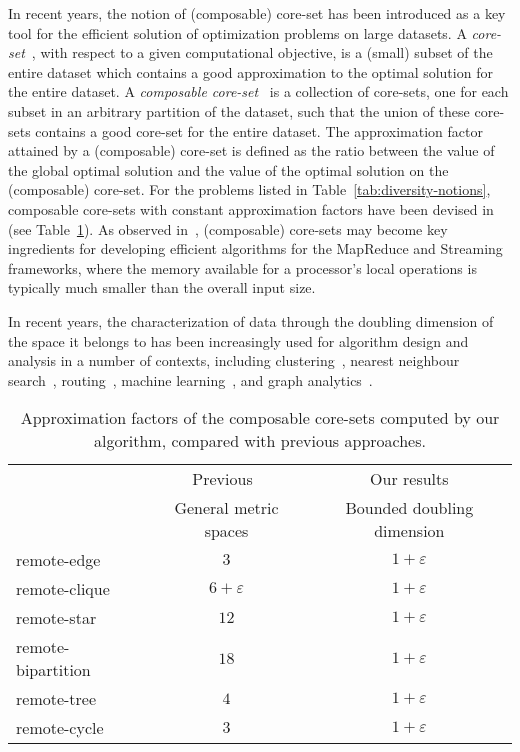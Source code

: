 \documentclass{article}
\renewcommand{\epsilon}{\varepsilon}
\begin{document}
In recent years, the notion of (composable) core-set has been
introduced as a key tool for the efficient solution of optimization
problems on large datasets.  A \emph{core-set}~\cite{AgarwalHV05},
with respect to a given computational objective, is a (small) subset
of the entire dataset which contains a good approximation to the
optimal solution for the entire dataset. A \emph{composable
  core-set}~\cite{IndykMMM14} is a collection of core-sets, one for
each subset in an arbitrary partition of the dataset, such that the
union of these core-sets contains a good core-set for the entire
dataset. The approximation factor attained by a (composable) core-set
is defined as the ratio between the value of the global optimal
solution and the value of the optimal solution on the (composable)
core-set. For the problems listed in
Table~\ref{tab:diversity-notions}, composable core-sets with constant
approximation factors have been devised in
\cite{IndykMMM14,AghamolaeiFZ15} (see
Table~\ref{tab:core-set-approximations}).  As observed
in~\cite{IndykMMM14}, (composable) core-sets may become key
ingredients for developing efficient algorithms for the MapReduce and
Streaming frameworks, where the memory available for a processor's
local operations is typically much smaller than the overall input
size.

In recent years, the characterization of data through the doubling
dimension of the space it belongs to has been increasingly used for
algorithm design and analysis in a number of contexts, including
clustering~\cite{AckermannBS10}, nearest neighbour
search~\cite{ColeL06}, routing~\cite{KonjevodRX08}, machine
learning~\cite{GottliebKK14}, and graph
analytics~\cite{CeccarelloPPU15, CeccarelloPPU16}.


\begin{table}
  \centering
  \begin{tabular}{lcc}\toprule
     & Previous~\cite{IndykMMM14,AghamolaeiFZ15}
     & Our results
    \\
     & {\footnotesize General metric spaces}
     & {\footnotesize Bounded doubling dimension}
    \\
    \midrule
    remote-edge
     & $3$
     & $1+\epsilon$
    \\
    remote-clique
& $6+\epsilon$ 
     & $1+\epsilon$
    \\
    remote-star
     & $12$ 
     & $1+\epsilon$
    \\
    remote-bipartition
     & $18$
     & $1+\epsilon$
    \\
    remote-tree
     & $4$ 
     & $1+\epsilon$
    \\
    remote-cycle
     & $3$ 
     & $1+\epsilon$
    \\
    \bottomrule
  \end{tabular}
  \caption{Approximation factors of the composable core-sets computed by our algorithm,
    compared with previous approaches.}\label{tab:core-set-approximations}
\end{table}
\end{document}
